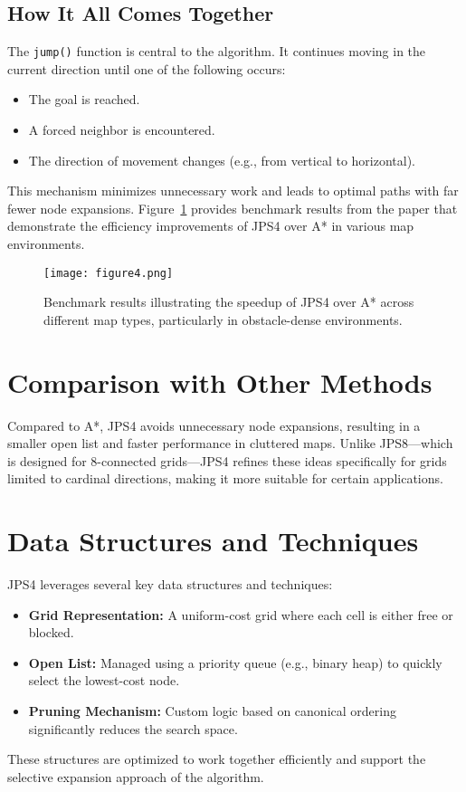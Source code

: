 \documentclass[11pt]{article}
\begin{document}
\subsection*{How It All Comes Together}
The \texttt{jump()} function is central to the algorithm. It continues moving in the current direction until one of the following occurs:
\begin{itemize}
    \item The goal is reached.
    \item A forced neighbor is encountered.
    \item The direction of movement changes (e.g., from vertical to horizontal).
\end{itemize}
This mechanism minimizes unnecessary work and leads to optimal paths with far fewer node expansions. Figure~\ref{fig:benchmarks} provides benchmark results from the paper that demonstrate the efficiency improvements of JPS4 over A* in various map environments.

\begin{figure}[H]
    \centering
    \texttt{[image: figure4.png]}
    \caption{Benchmark results illustrating the speedup of JPS4 over A* across different map types, particularly in obstacle-dense environments.}
    \label{fig:benchmarks}
\end{figure}

\section{Comparison with Other Methods}
Compared to A*, JPS4 avoids unnecessary node expansions, resulting in a smaller open list and faster performance in cluttered maps. Unlike JPS8—which is designed for 8-connected grids—JPS4 refines these ideas specifically for grids limited to cardinal directions, making it more suitable for certain applications.

\section{Data Structures and Techniques}
JPS4 leverages several key data structures and techniques:
\begin{itemize}
    \item \textbf{Grid Representation:} A uniform-cost grid where each cell is either free or blocked.
    \item \textbf{Open List:} Managed using a priority queue (e.g., binary heap) to quickly select the lowest-cost node.
    \item \textbf{Pruning Mechanism:} Custom logic based on canonical ordering significantly reduces the search space.
\end{itemize}
These structures are optimized to work together efficiently and support the selective expansion approach of the algorithm.
\end{document}
